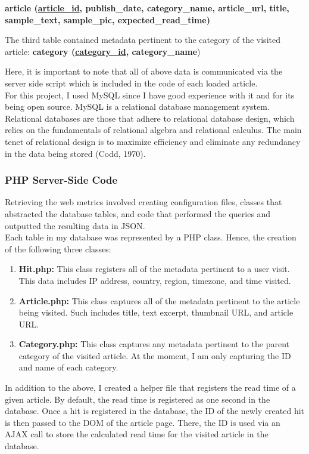 \documentclass[12pt]{article}
\begin{document}
{\textbf{article (\underline{article\_id}, publish\_date, category\_name, article\_url, title, sample\_text, sample\_pic, expected\_read\_time)} 

\newpage

\noindent The third table contained metadata pertinent to the category of the visited article: 
{\textbf{category (\underline{category\_id}, category\_name})}

\noindent Here, it is important to note that all of above data is communicated via the server side script which is included in the code of each loaded article. \\

For this project, I used MySQL since I have good experience with it and for its being open source. MySQL is a relational database management system. Relational databases are those that adhere to relational database design, which relies on the fundamentals of relational algebra and relational calculus. The main tenet of relational design is to maximize efficiency and eliminate any redundancy in the data being stored (Codd, 1970).


\newpage

\subsubsection{PHP Server-Side Code}
Retrieving the web metrics involved creating configuration files, classes that abstracted the database tables, and code that performed the queries and outputted the resulting data in JSON. \\


Each table in my database was represented by a PHP class. Hence, the creation of the following three classes:
\begin{enumerate}
\item{\textbf{Hit.php:}} This class registers all of the metadata pertinent to a user visit. This data includes IP address, country, region, timezone, and time visited. 
\item{\textbf{Article.php:}} This class captures all of the metadata pertinent to the article being visited. Such includes title, text excerpt, thumbnail URL, and article URL.
\item{\textbf{Category.php:}} This class captures any metadata pertinent to the parent category of the visited article. At the moment, I am only capturing the ID and name of each category.
\end{enumerate}

In addition to the above, I created a helper file that registers the read time of a given article. By default, the read time is registered as one second in the database. Once a hit is registered in the database, the ID of the newly created hit is then passed to the DOM of the article page. There, the ID is used via an AJAX call to store the calculated read time for the visited article in the database. 
\vfill

}
\end{document}
